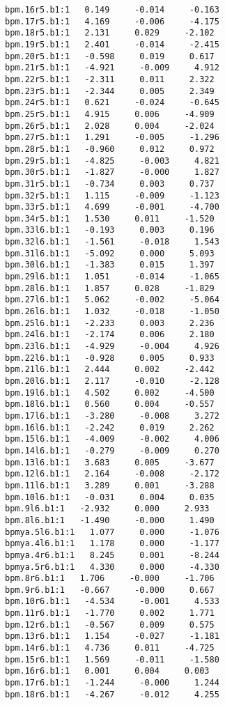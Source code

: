 \begin{verbatim}
bpm.16r5.b1:1   0.149     -0.014     -0.163
bpm.17r5.b1:1   4.169     -0.006     -4.175
bpm.18r5.b1:1   2.131     0.029     -2.102
bpm.19r5.b1:1   2.401     -0.014     -2.415
bpm.20r5.b1:1   -0.598     0.019     0.617
bpm.21r5.b1:1   -4.921     -0.009     4.912
bpm.22r5.b1:1   -2.311     0.011     2.322
bpm.23r5.b1:1   -2.344     0.005     2.349
bpm.24r5.b1:1   0.621     -0.024     -0.645
bpm.25r5.b1:1   4.915     0.006     -4.909
bpm.26r5.b1:1   2.028     0.004     -2.024
bpm.27r5.b1:1   1.291     -0.005     -1.296
bpm.28r5.b1:1   -0.960     0.012     0.972
bpm.29r5.b1:1   -4.825     -0.003     4.821
bpm.30r5.b1:1   -1.827     -0.000     1.827
bpm.31r5.b1:1   -0.734     0.003     0.737
bpm.32r5.b1:1   1.115     -0.009     -1.123
bpm.33r5.b1:1   4.699     -0.001     -4.700
bpm.34r5.b1:1   1.530     0.011     -1.520
bpm.33l6.b1:1   -0.193     0.003     0.196
bpm.32l6.b1:1   -1.561     -0.018     1.543
bpm.31l6.b1:1   -5.092     0.000     5.093
bpm.30l6.b1:1   -1.383     0.015     1.397
bpm.29l6.b1:1   1.051     -0.014     -1.065
bpm.28l6.b1:1   1.857     0.028     -1.829
bpm.27l6.b1:1   5.062     -0.002     -5.064
bpm.26l6.b1:1   1.032     -0.018     -1.050
bpm.25l6.b1:1   -2.233     0.003     2.236
bpm.24l6.b1:1   -2.174     0.006     2.180
bpm.23l6.b1:1   -4.929     -0.004     4.926
bpm.22l6.b1:1   -0.928     0.005     0.933
bpm.21l6.b1:1   2.444     0.002     -2.442
bpm.20l6.b1:1   2.117     -0.010     -2.128
bpm.19l6.b1:1   4.502     0.002     -4.500
bpm.18l6.b1:1   0.560     0.004     -0.557
bpm.17l6.b1:1   -3.280     -0.008     3.272
bpm.16l6.b1:1   -2.242     0.019     2.262
bpm.15l6.b1:1   -4.009     -0.002     4.006
bpm.14l6.b1:1   -0.279     -0.009     0.270
bpm.13l6.b1:1   3.683     0.005     -3.677
bpm.12l6.b1:1   2.164     -0.008     -2.172
bpm.11l6.b1:1   3.289     0.001     -3.288
bpm.10l6.b1:1   -0.031     0.004     0.035
bpm.9l6.b1:1   -2.932     0.000     2.933
bpm.8l6.b1:1   -1.490     -0.000     1.490
bpmya.5l6.b1:1   1.077     0.000     -1.076
bpmya.4l6.b1:1   1.178     0.000     -1.177
bpmya.4r6.b1:1   8.245     0.001     -8.244
bpmya.5r6.b1:1   4.330     0.000     -4.330
bpm.8r6.b1:1   1.706     -0.000     -1.706
bpm.9r6.b1:1   -0.667     -0.000     0.667
bpm.10r6.b1:1   -4.534     -0.001     4.533
bpm.11r6.b1:1   -1.770     0.002     1.771
bpm.12r6.b1:1   -0.567     0.009     0.575
bpm.13r6.b1:1   1.154     -0.027     -1.181
bpm.14r6.b1:1   4.736     0.011     -4.725
bpm.15r6.b1:1   1.569     -0.011     -1.580
bpm.16r6.b1:1   0.001     0.004     0.003
bpm.17r6.b1:1   -1.244     -0.000     1.244
bpm.18r6.b1:1   -4.267     -0.012     4.255

\end{verbatim}
